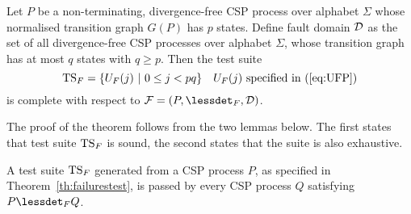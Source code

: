 \begin{theorem}\label{th:failurestest}
Let $P$ be a non-terminating, divergence-free CSP process over alphabet $\Sigma$ whose
normalised transition graph $G(P)$ has $p$ states. Define fault domain ${\cal
D}$ as the set of all divergence-free CSP processes over alphabet $\Sigma$,
whose transition graph has at most $q$ states with $q \ge p$. Then the test
suite
\[
{\text{TS}}_F = \{ U_F(j)~|~0 \le j < pq  \}\quad\text{$U_F(j)$ specified in (\ref{eq:UFP})}
\]
is complete with respect to ${\cal F} = (P,\lessdet_F,{\cal D})$.
\end{theorem}
%
The proof of the theorem follows from the two lemmas below. The first states
that test suite ${\text{TS}}_F$ is sound, the second states that the suite is also
exhaustive.
%
\begin{lemma}\label{lemma:mainfsound}
A test suite ${\text{TS}}_F$ generated from a CSP process $P$, as specified in
Theorem~\ref{th:failurestest}, is passed by every CSP process $Q$ satisfying
$P\lessdet_F Q$.
\end{lemma}
